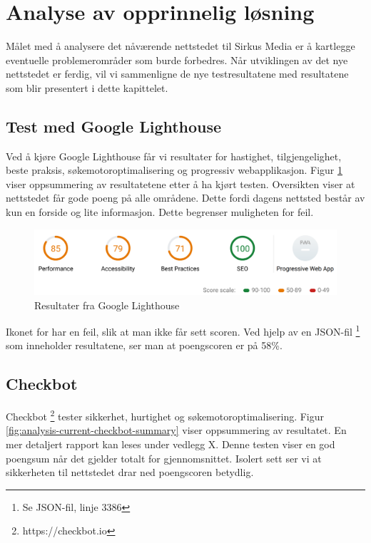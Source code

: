 \clearpage

\section{Analyse av opprinnelig løsning}

Målet med å analysere det nåværende nettstedet til Sirkus Media er å kartlegge eventuelle problemerområder som burde forbedres. Når utviklingen av det nye nettstedet er ferdig, vil vi sammenligne de nye testresultatene med resultatene som blir presentert i dette kapittelet.


\subsection{Test med Google Lighthouse}
\label{sec:analysis-current-lighthouse}

Ved å kjøre Google Lighthouse får vi resultater for hastighet, tilgjengelighet, beste praksis, søkemotoroptimalisering og progressiv webapplikasjon. Figur \ref{fig:analysis-current-lightouse-summary} viser oppsummering av resultatetene etter å ha kjørt testen. Oversikten viser at nettstedet får gode poeng på alle områdene. Dette fordi dagens nettsted består av kun en forside og lite informasjon. Dette begrenser muligheten for feil.

\begin{figure}[H]
    \centering
    \includegraphics[width=\textwidth]{bjornar/Lighthouse Report - mobile.png}
    \caption{Resultater fra Google Lighthouse}
    \label{fig:analysis-current-lightouse-summary}
\end{figure}


Ikonet for  har en feil, slik at man ikke får sett scoren. Ved hjelp av en JSON-fil \footnote{Se JSON-fil, linje 3386} som inneholder resultatene, ser man at poengscoren er på 58\%.


\subsection{Checkbot}
Checkbot \footnote{https://checkbot.io} tester sikkerhet, hurtighet og søkemotoroptimalisering. Figur \ref{fig:analysis-current-checkbot-summary} viser oppsummering av resultatet. En mer detaljert rapport kan leses under vedlegg X. Denne testen viser en god poengsum når det gjelder totalt for gjennomsnittet. Isolert sett ser vi at sikkerheten til nettstedet drar ned poengscoren betydlig.

